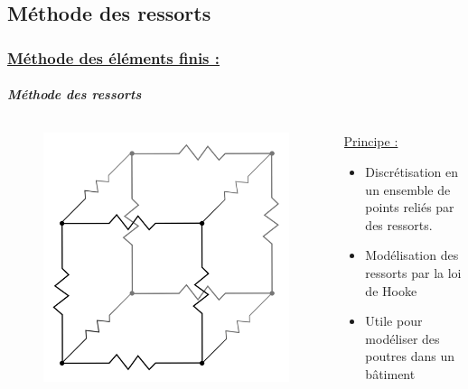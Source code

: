 \documentclass[10pt]{beamer}
\begin{document}
	\subsection{M\'ethode des ressorts}
	\begin{frame}
		\frametitle{\uline{M\'ethode des \'el\'ements finis :}}
		\framesubtitle{\textit{M\'ethode des ressorts}}
		\begin{columns}[t]
 			\begin{column}{5cm}
 				\begin{figure}
 				 	\includegraphics[scale=0.50]{Images/cubeFinal.png}
 				\end{figure}
			\end{column}
			\begin{column}{5cm}
				\begin{block}{}
					\uline{Principe :}
					\begin{itemize}
						\item Discr\'etisation en un ensemble de points reli\'es par des ressorts.
						\item Mod\'elisation des ressorts par la loi de Hooke
						\item Utile pour mod\'eliser des poutres dans un b\^atiment
					\end{itemize}
				\end{block}
  			\end{column}
 		\end{columns}
	\end{frame}
\end{document}
